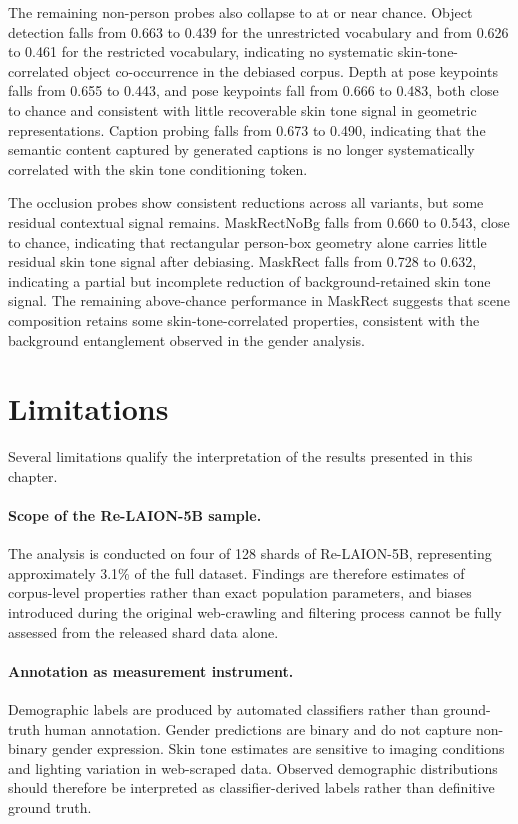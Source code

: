 The remaining non-person probes also collapse to at or near chance. Object detection falls from 0.663 to 0.439 for the unrestricted vocabulary and from 0.626 to 0.461 for the restricted vocabulary, indicating no systematic skin-tone-correlated object co-occurrence in the debiased corpus. Depth at pose keypoints falls from 0.655 to 0.443, and pose keypoints fall from 0.666 to 0.483, both close to chance and consistent with little recoverable skin tone signal in geometric representations. Caption probing falls from 0.673 to 0.490, indicating that the semantic content captured by generated captions is no longer systematically correlated with the skin tone conditioning token.

The occlusion probes show consistent reductions across all variants, but some residual contextual signal remains. MaskRectNoBg falls from 0.660 to 0.543, close to chance, indicating that rectangular person-box geometry alone carries little residual skin tone signal after debiasing. MaskRect falls from 0.728 to 0.632, indicating a partial but incomplete reduction of background-retained skin tone signal. The remaining above-chance performance in MaskRect suggests that scene composition retains some skin-tone-correlated properties, consistent with the background entanglement observed in the gender analysis.

\section{Limitations}
\label{sec:limitations}

Several limitations qualify the interpretation of the results presented in this chapter.

\paragraph{Scope of the Re-LAION-5B sample.}
The analysis is conducted on four of 128 shards of Re-LAION-5B, representing approximately 3.1\% of the full dataset. Findings are therefore estimates of corpus-level properties rather than exact population parameters, and biases introduced during the original web-crawling and filtering process cannot be fully assessed from the released shard data alone.

\paragraph{Annotation as measurement instrument.}
Demographic labels are produced by automated classifiers rather than ground-truth human annotation. Gender predictions are binary and do not capture non-binary gender expression. Skin tone estimates are sensitive to imaging conditions and lighting variation in web-scraped data. Observed demographic distributions should therefore be interpreted as classifier-derived labels rather than definitive ground truth.

